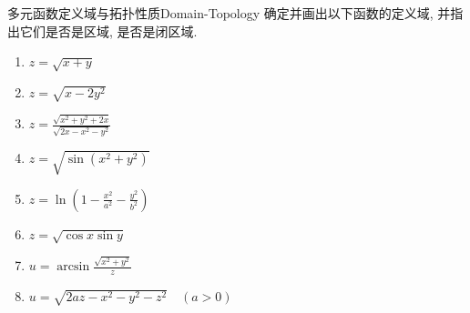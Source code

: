 \begin{problem}{多元函数定义域与拓扑性质}{Domain-Topology}
    确定并画出以下函数的定义域, 并指出它们是否是区域, 是否是闭区域.
    \begin{enumerate}
        \item $z = \sqrt{x+y}$
        \item $z = \sqrt{x - 2y^2}$
        \item $z = \frac{\sqrt{x^2+y^2+2x}}{\sqrt{2x-x^2-y^2}}$
        \item $z = \sqrt{\sin(x^2+y^2)}$
        \item $z = \ln\left(1 - \frac{x^2}{a^2} - \frac{y^2}{b^2}\right)$
        \item $z = \sqrt{\cos x \sin y}$
        \item $u = \arcsin \frac{\sqrt{x^2+y^2}}{z}$
        \item $u = \sqrt{2az - x^2 - y^2 - z^2} \quad (a > 0)$
    \end{enumerate}
\end{problem}

